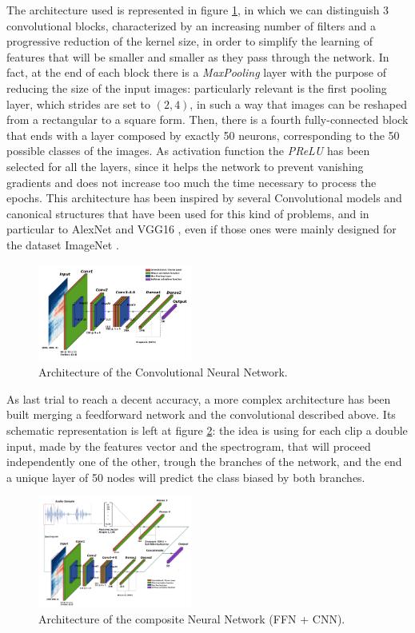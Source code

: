The architecture used is represented in figure \ref{fig:cnn_architecture}, in which we can distinguish 3 convolutional blocks, characterized by an increasing number of filters and a progressive reduction of the kernel size, in order to simplify the learning of features that will be smaller and smaller as they pass through the network. In fact, at the end of each block there is a \textit{MaxPooling} layer with the purpose of reducing the size of the input images: particularly relevant is the first pooling layer, which strides are set to $(2,4)$, in such a way that images can be reshaped from a rectangular to a square form. Then, there is a fourth fully-connected block that ends with a layer composed by exactly 50 neurons, corresponding to the 50 possible classes of the images. As activation function the \textit{PReLU} has been selected for all the layers, since it helps the network to prevent vanishing gradients and does not increase too much the time necessary to process the epochs. This architecture has been inspired by several Convolutional models and canonical structures that have been used for this kind of problems, and in particular to AlexNet \cite{alexnet} and VGG16 \cite{vgg16}, even if those ones were mainly designed for the dataset ImageNet \cite{imagenet}.
\begin{figure}[!h]
	\centering
	\includegraphics[width=0.45\textwidth]{pictures/cnn_architecture.pdf}
	\caption{Architecture of the Convolutional Neural Network.}
	\label{fig:cnn_architecture}
\end{figure}

As last trial to reach a decent accuracy, a more complex architecture has been built merging a feedforward network and the convolutional described above. Its schematic representation is left at figure \ref{fig:finalnet_architecture}: the idea is using for each clip a double input, made by the features vector and the spectrogram, that will proceed independently one of the other, trough the branches of the network, and the end a unique layer of 50 nodes will predict the class biased by both branches.

\begin{figure}[!h]
	\centering
	\includegraphics[width=0.45\textwidth]{pictures/finalnet_architecture.pdf}
	\caption{Architecture of the composite Neural Network (FFN + CNN).}
	\label{fig:finalnet_architecture}
\end{figure}



